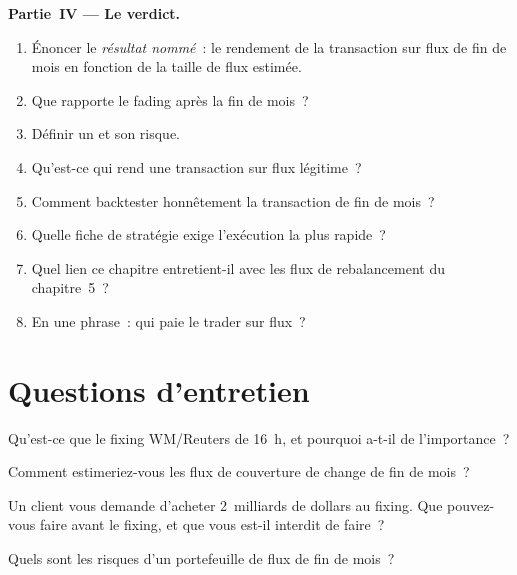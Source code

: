 \begin{problem}
\medskip\noindent\textbf{Partie~IV --- Le verdict.}
\begin{enumerate}[resume]
\item Énoncer le \emph{résultat nommé}~: le rendement de la transaction sur flux de fin de mois en fonction de la taille de flux estimée.
\item Que rapporte le fading après la fin de mois~?
\item Définir un  et son risque.
\item Qu'est-ce qui rend une transaction sur flux légitime~?
\item Comment backtester honnêtement la transaction de fin de mois~?
\item Quelle fiche de stratégie exige l'exécution la plus rapide~?
\item Quel lien ce chapitre entretient-il avec les flux de rebalancement du chapitre~5~?
\item En une phrase~: qui paie le trader sur flux~?
\end{enumerate}
\end{problem}

\section{Questions d'entretien}

\begin{interviewq}\label{iq:s2:fx-flow-strategies:1}
Qu'est-ce que le fixing WM/Reuters de 16~h, et pourquoi a-t-il de l'importance~?
\end{interviewq}

\begin{interviewq}\label{iq:s2:fx-flow-strategies:2}
Comment estimeriez-vous les flux de couverture de change de fin de mois~?
\end{interviewq}

\begin{interviewq}\label{iq:s2:fx-flow-strategies:3}
Un client vous demande d'acheter 2~milliards de dollars au fixing. Que pouvez-vous faire avant le fixing, et que vous est-il interdit de faire~?
\end{interviewq}

\begin{interviewq}\label{iq:s2:fx-flow-strategies:4}
Quels sont les risques d'un portefeuille de flux de fin de mois~?
\end{interviewq}

